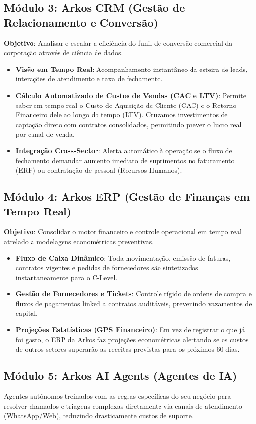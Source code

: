 \documentclass[12pt,a4paper,oneside]{report}
\begin{document}
\subsection{Módulo 3: Arkos CRM (Gestão de Relacionamento e Conversão)}
\textbf{Objetivo}: Analisar e escalar a eficiência do funil de conversão comercial da corporação através de ciência de dados.
\begin{itemize}
    \item \textbf{Visão em Tempo Real}: Acompanhamento instantâneo da esteira de leads, interações de atendimento e taxa de fechamento.
    \item \textbf{Cálculo Automatizado de Custos de Vendas (CAC e LTV)}: Permite saber em tempo real o Custo de Aquisição de Cliente (CAC) e o Retorno Financeiro dele ao longo do tempo (LTV). Cruzamos investimentos de captação direto com contratos consolidados, permitindo prever o lucro real por canal de venda.
    \item \textbf{Integração Cross-Sector}: Alerta automático à operação se o fluxo de fechamento demandar aumento imediato de suprimentos no faturamento (ERP) ou contratação de pessoal (Recursos Humanos).
\end{itemize}

\subsection{Módulo 4: Arkos ERP (Gestão de Finanças em Tempo Real)}
\textbf{Objetivo}: Consolidar o motor financeiro e controle operacional em tempo real atrelado a modelagens econométricas preventivas.
\begin{itemize}
    \item \textbf{Fluxo de Caixa Dinâmico}: Toda movimentação, emissão de faturas, contratos vigentes e pedidos de fornecedores são sintetizados instantaneamente para o C-Level.
    \item \textbf{Gestão de Fornecedores e Tickets}: Controle rígido de ordens de compra e fluxos de pagamentos linked a contratos auditáveis, prevenindo vazamentos de capital.
    \item \textbf{Projeções Estatísticas (GPS Financeiro)}: Em vez de registrar o que já foi gasto, o ERP da Arkos faz projeções econométricas alertando se os custos de outros setores superarão as receitas previstas para os próximos 60 dias.
\end{itemize}

\subsection{Módulo 5: Arkos AI Agents (Agentes de IA)}
Agentes autônomos treinados com as regras específicas do seu negócio para resolver chamados e triagens complexas diretamente via canais de atendimento (WhatsApp/Web), reduzindo drasticamente custos de suporte.
\end{document}

